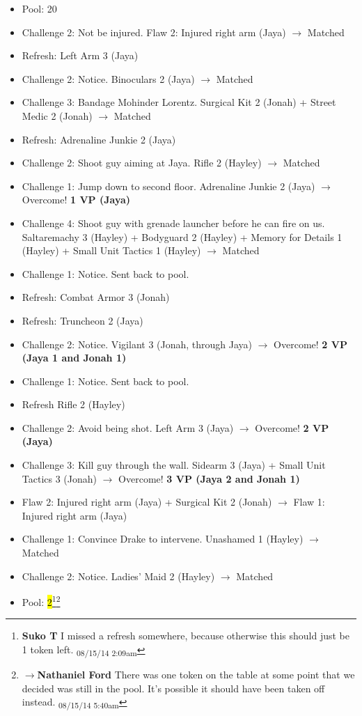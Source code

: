 \begin{itemize}[noitemsep,topsep=0pt]
\item Pool: 20
\item Challenge 2: Not be injured.  Flaw 2: Injured right arm (Jaya) $\rightarrow$ Matched
\item Refresh: Left Arm 3 (Jaya)
\item Challenge 2: Notice.  Binoculars 2 (Jaya) $\rightarrow$ Matched
\item Challenge 3: Bandage Mohinder Lorentz.  Surgical Kit 2 (Jonah) + Street Medic 2 (Jonah) $\rightarrow$ Matched
\item Refresh: Adrenaline Junkie 2 (Jaya)
\item Challenge 2: Shoot guy aiming at Jaya. Rifle 2 (Hayley) $\rightarrow$ Matched
\item Challenge 1: Jump down to second floor.  Adrenaline Junkie 2 (Jaya)  $\rightarrow$ Overcome! \textbf{1 VP (Jaya)}
\item Challenge 4: Shoot guy with grenade launcher before he can fire on us.  Saltaremachy 3 (Hayley) + Bodyguard 2 (Hayley) + Memory for Details 1 (Hayley) + Small Unit Tactics 1 (Hayley) $\rightarrow$ Matched
\item Challenge 1: Notice. Sent back to pool.
\item Refresh: Combat Armor 3 (Jonah)
\item Refresh: Truncheon 2 (Jaya)
\item Challenge 2: Notice.  Vigilant 3 (Jonah, through Jaya) $\rightarrow$ Overcome! \textbf{2 VP (Jaya 1 and Jonah 1)}
\item Challenge 1: Notice.  Sent back to pool.
\item Refresh Rifle 2 (Hayley)
\item Challenge 2:  Avoid being shot.  Left Arm 3 (Jaya) $\rightarrow$ Overcome! \textbf{2 VP (Jaya)}
\item Challenge 3: Kill guy through the wall.  Sidearm 3 (Jaya) + Small Unit Tactics 3 (Jonah)  $\rightarrow$ Overcome! \textbf{3 VP (Jaya 2 and Jonah 1)}
\item Flaw 2: Injured right arm (Jaya) + Surgical Kit 2 (Jonah) $\rightarrow$  {\color[RGB]{255,0,0}Flaw 1: Injured right arm (Jaya)} 
\item Challenge 1: Convince Drake to intervene.  Unashamed 1 (Hayley) $\rightarrow$ Matched
\item Challenge 2: Notice.  Ladies' Maid 2 (Hayley) $\rightarrow$ Matched
\item Pool: \hl{2}\footnote{\textbf{Suko T }I missed a refresh somewhere, because otherwise this should just be 1 token left. \textsubscript{08/15/14 2:09am}}\footnote{$\rightarrow$\textbf{Nathaniel Ford }There was one token on the table at some point that we decided was still in the pool. It's possible it should have been taken off instead. \textsubscript{08/15/14 5:40am}}
\end{itemize}


